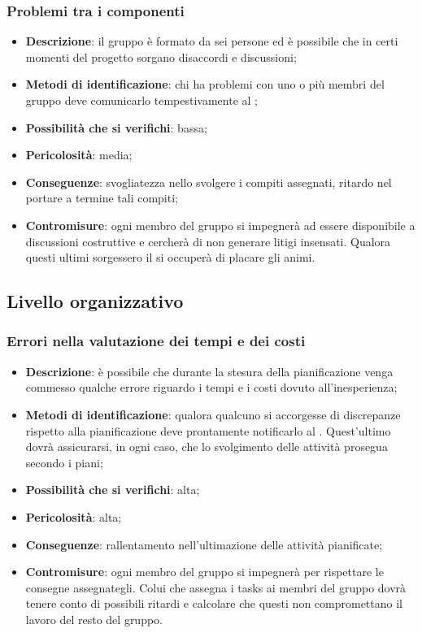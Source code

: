		
		\subsubsection{Problemi tra i componenti}
		\begin{itemize}
			\item \textbf{Descrizione}: il gruppo è formato da sei persone ed è possibile che in certi momenti del progetto sorgano disaccordi e discussioni;
			\item \textbf{Metodi di identificazione}: chi ha problemi con uno o più membri del gruppo deve comunicarlo tempestivamente al \RES{};
			\item \textbf{Possibilità che si verifichi}: bassa;
			\item \textbf{Pericolosità}: media;
			\item \textbf{Conseguenze}: svogliatezza nello svolgere i compiti assegnati, ritardo nel portare a termine tali compiti;
			\item \textbf{Contromisure}: ogni membro del gruppo si impegnerà ad essere disponibile a discussioni costruttive e cercherà di non generare litigi insensati. Qualora questi ultimi sorgessero il \RES{} si occuperà di placare gli animi.
		\end{itemize}
	
	\subsection{Livello organizzativo}
		\subsubsection{Errori nella valutazione dei tempi e dei costi}
		\begin{itemize}
			\item \textbf{Descrizione}: è possibile che durante la stesura della pianificazione venga commesso qualche errore riguardo i tempi e i costi dovuto all'inesperienza;
			\item \textbf{Metodi di identificazione}: qualora qualcuno si accorgesse di discrepanze rispetto alla pianificazione deve prontamente notificarlo al \RES{}. Quest'ultimo dovrà assicurarsi, in ogni caso, che lo svolgimento delle attività prosegua secondo i piani; 
			\item \textbf{Possibilità che si verifichi}: alta;
			\item \textbf{Pericolosità}: alta;
			\item \textbf{Conseguenze}: rallentamento nell'ultimazione delle attività pianificate;
			\item \textbf{Contromisure}: ogni membro del gruppo si impegnerà per rispettare le consegne assegnategli. Colui che assegna i tasks ai membri del gruppo dovrà tenere conto di possibili ritardi e calcolare che questi non compromettano il lavoro del resto del gruppo. 
		\end{itemize}
		
